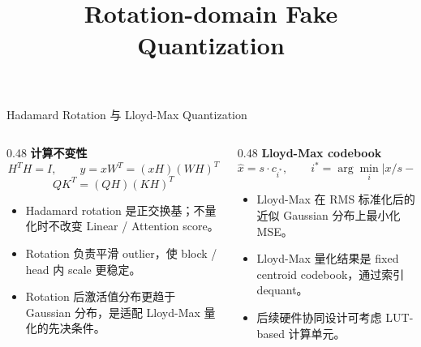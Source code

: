 \documentclass[10pt,aspectratio=169,xcolor={dvipsnames}]{beamer}
\title{Rotation-domain Fake Quantization}
\author{}
\date{}
\newcommand{\keypoint}[1]{\textbf{#1}}
\begin{document}
\begin{frame}{Hadamard Rotation 与 Lloyd-Max Quantization}
  \begin{columns}[T,onlytextwidth]
    \begin{column}{0.48\textwidth}
      \keypoint{计算不变性}
      \[
        H^{T}H=I,\qquad
        y=xW^{T}=(xH)(WH)^{T}
      \]
      \[
        QK^{T}=(QH)(KH)^{T}
      \]
      \vspace{-0.2em}
      \begin{itemize}
        \item Hadamard rotation 是正交换基；不量化时不改变 Linear / Attention score。
        \item Rotation 负责平滑 outlier，使 block / head 内 scale 更稳定。
        \item Rotation 后激活值分布更趋于 Gaussian 分布，是适配 Lloyd-Max 量化的先决条件。
      \end{itemize}
    \end{column}
    \begin{column}{0.48\textwidth}
      \keypoint{Lloyd-Max codebook}
      \[
        \hat{x}=s\cdot c_{i^{*}},\qquad
        i^{*}=\arg\min_i \left|x/s-c_i\right|
      \]
      \vspace{-0.4em}
      \begin{center}
      \end{center}
      \begin{itemize}
        \item Lloyd-Max 在 RMS 标准化后的近似 Gaussian 分布上最小化 MSE。
        \item Lloyd-Max 量化结果是 fixed centroid codebook，通过索引 dequant。
        \item 后续硬件协同设计可考虑 LUT-based 计算单元。
      \end{itemize}
    \end{column}
  \end{columns}
\end{frame}
\end{document}
